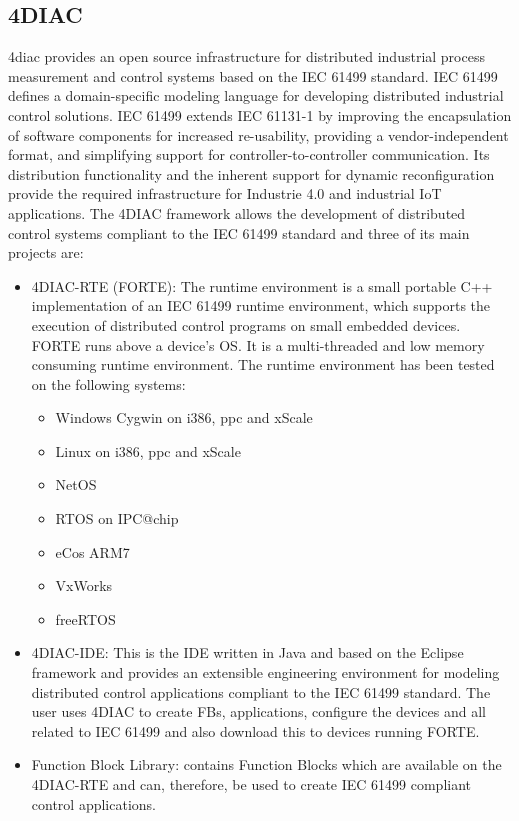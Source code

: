 \subsection{4DIAC}\label{app:4DIAC}
%
4diac provides an open source infrastructure for distributed industrial process measurement and control systems based on the IEC 61499 standard. IEC 61499 defines a domain-specific
modeling language for developing distributed industrial control solutions. IEC 61499 extends IEC 61131-1 by improving the encapsulation of software components for increased re-usability, 
providing a vendor-independent format, and simplifying support for controller-to-controller communication. Its distribution functionality and the inherent support for dynamic reconfiguration 
provide the required infrastructure for Industrie 4.0 and industrial IoT applications.
%
The 4DIAC framework allows the development of distributed control systems compliant to the IEC 61499 standard and three of its main projects are:
%
\begin{itemize}
  \item 4DIAC-RTE (FORTE): The runtime environment is a small portable C++ implementation of an IEC 61499 runtime environment, which supports the execution of distributed control programs 
  on small embedded devices. FORTE runs above a device's OS. It is a multi-threaded and low memory consuming runtime environment. The runtime environment has been tested on the following systems:
  \begin{itemize}
    \item Windows Cygwin on i386, ppc and xScale
    \item Linux on i386, ppc and xScale
    \item NetOS
    \item RTOS on IPC@chip
    \item eCos ARM7
    \item VxWorks
    \item freeRTOS
  \end{itemize}     
  \item 4DIAC-IDE: This is the IDE written in Java and based on the Eclipse framework and provides an extensible engineering environment for modeling 
  distributed control applications compliant to the IEC 61499 standard. The user uses 4DIAC to create FBs, applications, configure the devices and all related to IEC 61499 and also download this 
  to devices running FORTE.
  \item Function Block Library: contains Function Blocks which are available on the 4DIAC-RTE and can, therefore, be used to create IEC 61499 compliant control applications.
\end{itemize}
